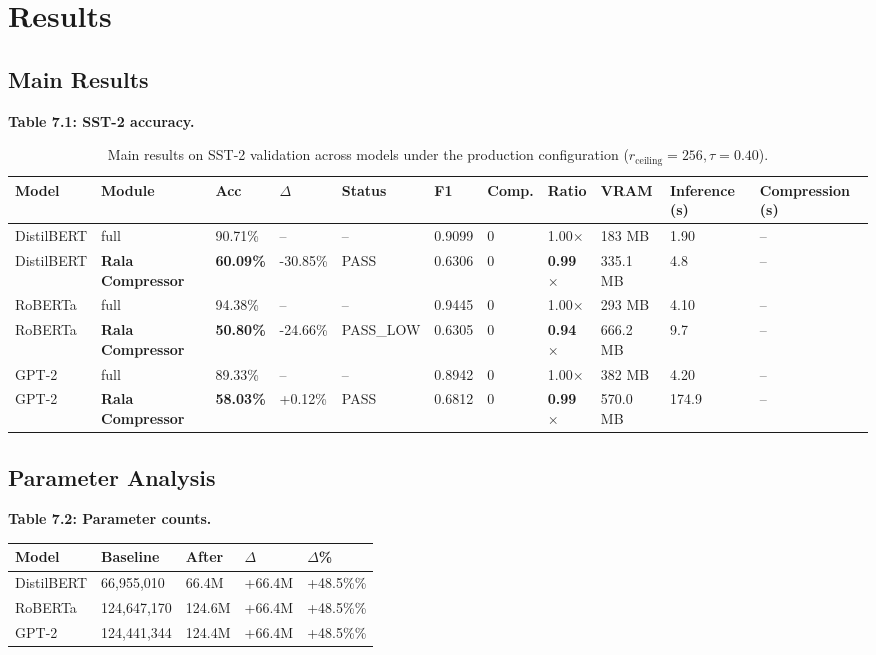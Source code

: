 
\section{Results}

\subsection{Main Results}

\textbf{Table 7.1: SST-2 accuracy.}

\begin{table}[t]
\centering
\small
\begin{tabular}{lllllllllll}
\toprule
\textbf{Model} & \textbf{Module} & \textbf{Acc} & \textbf{$\Delta$} & \textbf{Status} & \textbf{F1} & \textbf{Comp.} & \textbf{Ratio} & \textbf{VRAM} & \textbf{Inference (s)} & \textbf{Compression (s)} \\
\midrule
DistilBERT & full & 90.71\% & -- & -- & 0.9099 & 0 & 1.00$\times$ & 183 MB & 1.90 & -- \\
DistilBERT & \textbf{Rala Compressor} & \textbf{60.09\%} & -30.85\% & PASS & 0.6306 & 0 & \textbf{0.99$\times$} & 335.1 MB & 4.8 & -- \\
RoBERTa & full & 94.38\% & -- & -- & 0.9445 & 0 & 1.00$\times$ & 293 MB & 4.10 & -- \\
RoBERTa & \textbf{Rala Compressor} & \textbf{50.80\%} & -24.66\% & PASS_LOW & 0.6305 & 0 & \textbf{0.94$\times$} & 666.2 MB & 9.7 & -- \\
GPT-2 & full & 89.33\% & -- & -- & 0.8942 & 0 & 1.00$\times$ & 382 MB & 4.20 & -- \\
GPT-2 & \textbf{Rala Compressor} & \textbf{58.03\%} & +0.12\% & PASS & 0.6812 & 0 & \textbf{0.99$\times$} & 570.0 MB & 174.9 & -- \\
\bottomrule
\end{tabular}
\caption{Main results on SST-2 validation across models under the production configuration ($r_{\mathrm{ceiling}}=256, \tau=0.40$).}
\label{tab:main_sst2}
\end{table}

\subsection{Parameter Analysis}

\textbf{Table 7.2: Parameter counts.}

\begin{table}[H]
\centering
\small
\begin{tabular}{lllll}
\toprule
\textbf{Model} & \textbf{Baseline} & \textbf{After} & \textbf{$\Delta$} & \textbf{$\Delta$\%} \\
\midrule
DistilBERT & 66,955,010 & 66.4M & +66.4M & +48.5\%\% \\
RoBERTa & 124,647,170 & 124.6M & +66.4M & +48.5\%\% \\
GPT-2 & 124,441,344 & 124.4M & +66.4M & +48.5\%\% \\
\bottomrule
\end{tabular}
\end{table}

